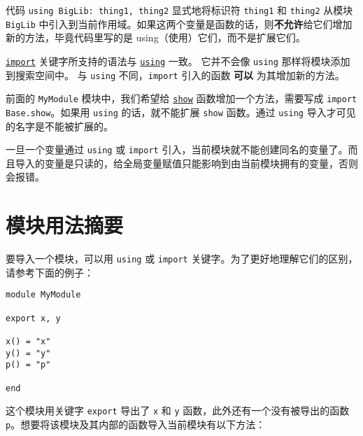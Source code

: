 代码 \texttt{using BigLib: thing1, thing2} 显式地将标识符 \texttt{thing1} 和 \texttt{thing2} 从模块 \texttt{BigLib} 中引入到当前作用域。如果这两个变量是函数的话，则\textbf{不允许}给它们增加新的方法，毕竟代码里写的是 {\textquotedbl}using{\textquotedbl}（使用）它们，而不是扩展它们。



\hyperlink{16252475688663093021}{\texttt{import}} 关键字所支持的语法与 \hyperlink{169458112978175560}{\texttt{using}} 一致。 它并不会像 \texttt{using} 那样将模块添加到搜索空间中。 与 \texttt{using} 不同，\texttt{import} 引入的函数 \textbf{可以} 为其增加新的方法。



前面的 \texttt{MyModule} 模块中，我们希望给 \hyperlink{14071376285304310153}{\texttt{show}} 函数增加一个方法，需要写成 \texttt{import Base.show}。如果用 \texttt{using} 的话，就不能扩展 \texttt{show} 函数。通过 \texttt{using} 导入才可见的名字是不能被扩展的。



一旦一个变量通过 \texttt{using} 或 \texttt{import} 引入，当前模块就不能创建同名的变量了。而且导入的变量是只读的，给全局变量赋值只能影响到由当前模块拥有的变量，否则会报错。



\hypertarget{14242284106617888119}{}


\section{模块用法摘要}



要导入一个模块，可以用 \texttt{using} 或 \texttt{import} 关键字。为了更好地理解它们的区别，请参考下面的例子：




\begin{verbatim}
module MyModule

export x, y

x() = "x"
y() = "y"
p() = "p"

end
\end{verbatim}



这个模块用关键字 \texttt{export} 导出了 \texttt{x} 和 \texttt{y} 函数，此外还有一个没有被导出的函数 \texttt{p}。想要将该模块及其内部的函数导入当前模块有以下方法：




